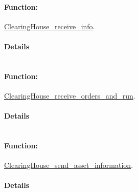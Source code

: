 \documentclass[a4paper,11pt]{article}
\begin{document}
\paragraph{Function:}\url{ClearingHouse_receive_info}.

\paragraph{Details}
\begin{verbatim}
\end{verbatim}
\paragraph{Function:}\url{ClearingHouse_receive_orders_and_run}.

\paragraph{Details}
\begin{verbatim}
\end{verbatim}
\paragraph{Function:}\url{ClearingHouse_send_asset_information}.

\paragraph{Details}
\begin{verbatim}
\end{verbatim}
\end{document}
